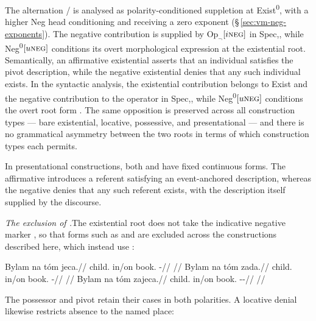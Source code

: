 The alternation / is analysed as polarity-conditioned
suppletion at Exist\textsuperscript{0}, with a higher Neg head conditioning
 and receiving a zero exponent
(§\,\ref{sec:vm-neg-exponents}). The negative
contribution is supplied by $\mathrm{Op}_{\neg}$$[i\textsc{neg}]$ in Spec,, while
Neg\textsuperscript{0}$[u\textsc{neg}]$ conditions its overt morphological expression at
the existential root. Semantically, an affirmative existential asserts that an individual satisfies
the pivot description, while the negative existential denies that any such
individual exists. In the syntactic analysis, the existential contribution belongs
to Exist and the negative contribution to the operator in Spec,,
while Neg\textsuperscript{0}$[u\textsc{neg}]$ conditions the overt root form .
The same opposition is preserved across all
construction types --- bare existential, locative, possessive, and
presentational --- and there is no grammatical asymmetry between the two roots
in terms of which construction types each permits.

In presentational constructions, both  and  have fixed
continuous forms. The affirmative introduces a referent satisfying an
event-anchored description, whereas the negative denies that any such referent
exists, with the description itself supplied by the discourse.

\noindent\textit{The exclusion of .}\enspace The existential root 
does not take the indicative negative marker , so that forms such as
 and  are excluded across the constructions
described here, which instead use :

\pex\label{ex:neg-book-possession}
\a
\begingl
\gla Bylam na tóm jeca.//
\glb child.\Ind{} in/on book.\Dir{} \Exst{}-\Cont{}//
\glft {}
//
\endgl
\a
\begingl
\gla Bylam na tóm zada.//
\glb child.\Ind{} in/on book.\Dir{} \NegExst{}-\Cont{}//
\glft {}
//
\endgl
\a
\begingl
\gla {*}Bylam na tóm zajeca.//
\glb child.\Ind{} in/on book.\Dir{} \Neg{}-\Exst{}-\Cont{}//
\glft {} //
\endgl
\xe

The possessor  and pivot  retain their cases in
both polarities. A locative denial likewise restricts absence to the named
place:

